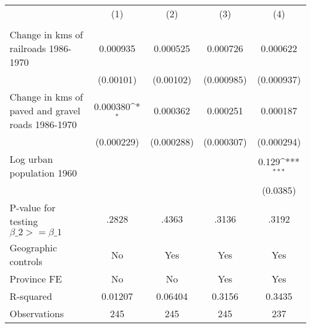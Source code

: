 {
\def\sym#1{\ifmmode^{#1}\else\(^{#1}\)\fi}
\begin{tabular}{l*{4}{c}}
\hline\hline
                &\multicolumn{1}{c}{(1)}&\multicolumn{1}{c}{(2)}&\multicolumn{1}{c}{(3)}&\multicolumn{1}{c}{(4)}\\
                &\multicolumn{1}{c}{}&\multicolumn{1}{c}{}&\multicolumn{1}{c}{}&\multicolumn{1}{c}{}\\
\hline
Change in kms of railroads 1986-1970& 0.000935         & 0.000525         & 0.000726         & 0.000622         \\
                &(0.00101)         &(0.00102)         &(0.000985)         &(0.000937)         \\
[1em]
Change in kms of paved and gravel roads 1986-1970& 0.000380\sym{*}  & 0.000362         & 0.000251         & 0.000187         \\
                &(0.000229)         &(0.000288)         &(0.000307)         &(0.000294)         \\
[1em]
Log urban population 1960&                  &                  &                  &    0.129\sym{***}\\
                &                  &                  &                  & (0.0385)         \\
\hline
P-value for testing $\beta\_{2} >= \beta\_{1}$&    .2828         &    .4363         &    .3136         &    .3192         \\
Geographic controls&       No         &      Yes         &      Yes         &      Yes         \\
Province FE     &       No         &       No         &      Yes         &      Yes         \\
R-squared       &  0.01207         &  0.06404         &   0.3156         &   0.3435         \\
Observations    &      245         &      245         &      245         &      237         \\
\hline\hline
\end{tabular}
}
